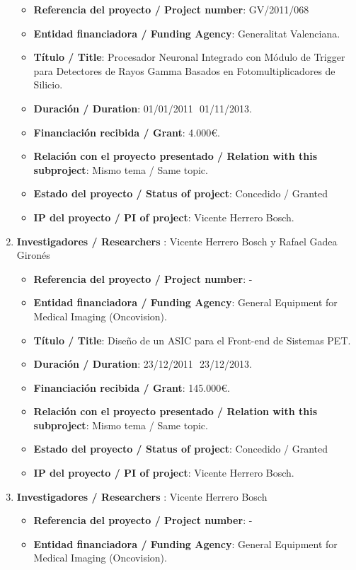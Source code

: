 \begin{enumerate}
\begin{itemize}
\item {\bf Referencia del proyecto / Project number}: GV/2011/068
\item {\bf Entidad financiadora / Funding Agency}: Generalitat Valenciana.
\item {\bf Título / Title}:  Procesador Neuronal Integrado con Módulo de Trigger para Detectores de Rayos Gamma Basados en Fotomultiplicadores de Silicio.
\item {\bf Duración / Duration}: 01/01/2011  01/11/2013. 
\item {\bf Financiación recibida / Grant}: 4.000\euro. 
\item {\bf Relación con el proyecto presentado / Relation with this subproject}: Mismo tema / Same topic. 
\item {\bf Estado del proyecto / Status of project}: Concedido / Granted
\item {\bf IP del proyecto / PI of project}: Vicente Herrero Bosch.
\end{itemize}
\item {\bf Investigadores / Researchers }: Vicente Herrero Bosch y Rafael Gadea Gironés
\begin{itemize}
\item {\bf Referencia del proyecto / Project number}: -
\item {\bf Entidad financiadora / Funding Agency}: General Equipment for Medical Imaging (Oncovision).
\item {\bf Título / Title}:  Diseño de un ASIC para el Front-end de Sistemas PET.
\item {\bf Duración / Duration}: 23/12/2011  23/12/2013. 
\item {\bf Financiación recibida / Grant}: 145.000\euro. 
\item {\bf Relación con el proyecto presentado / Relation with this subproject}: Mismo tema / Same topic. 
\item {\bf Estado del proyecto / Status of project}: Concedido / Granted
\item {\bf IP del proyecto / PI of project}: Vicente Herrero Bosch.
\end{itemize}
\item {\bf Investigadores / Researchers }: Vicente Herrero Bosch 
\begin{itemize}
\item {\bf Referencia del proyecto / Project number}: -
\item {\bf Entidad financiadora / Funding Agency}: General Equipment for Medical Imaging (Oncovision).

\end{itemize}
\end{enumerate}
